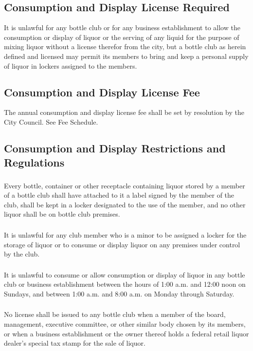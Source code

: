\subsection{Consumption and Display License Required}
It is unlawful for any bottle club or for any business establishment to allow the consumption or display of liquor or the serving of any liquid for the purpose of mixing liquor without a license therefor from the city, but a bottle club as herein defined and licensed may permit its members to bring and keep a personal supply of liquor in lockers assigned to the members.
\subsection{Consumption and Display License Fee}
The annual consumption and display license fee shall be set by resolution by the City Council. See Fee Schedule.
\subsection{Consumption and Display Restrictions and Regulations}
\subsubsection{}
Every bottle, container or other receptacle containing liquor stored by a member of a bottle club shall have attached to it a label signed by the member of the club, shall be kept in a locker designated to the use of the member, and no other liquor shall be on bottle club premises.
\subsubsection{}
It is unlawful for any club member who is a minor to be assigned a locker for the storage of liquor or to consume or display liquor on any premises under control by the club.
\subsubsection{}
It is unlawful to consume or allow consumption or display of liquor in any bottle club or business establishment between the hours of 1:00 a.m. and 12:00 noon on Sundays, and between 1:00 a.m. and 8:00 a.m. on Monday through Saturday.
\subsubsection{}
No license shall be issued to any bottle club when a member of the board, management, executive committee, or other similar body chosen by its members, or when a business establishment or the owner thereof holds a federal retail liquor dealer’s special tax stamp for the sale of liquor.
